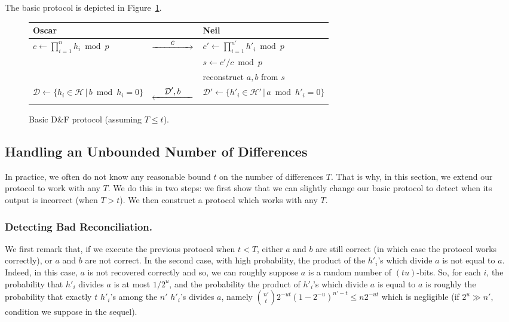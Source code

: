 \documentclass[twoside,envcountsame,runningheads]{llncs}
\newcommand{\Set}{\mathcal{H}}
\newcommand{\SetD}{\mathcal{D}}
\newcommand{\df}{D\&F\xspace}
\newcommand{\Rflow}[1]{\stackrel{\displaystyle #1}{\hbox to 5em{\rightarrowfill}}}
\newcommand{\Lflow}[1]{\stackrel{\displaystyle #1}{\hbox to 5em{\leftarrowfill}}}
\newcommand{\comm}[1]{\todo{#1}}
\begin{document}
The basic protocol is depicted in Figure~\ref{fig:basic-df}.

\begin{figure}[t]
\centering
\begin{tabular}{p{}cp{}}
\toprule
\textbf{Oscar}                    &                        & \textbf{Neil}\\
\midrule
$c \gets \prod_{i=1}^n h_i \bmod p$        & $\Rflow{c}$               & $c' \gets \prod_{i=1}^{n'} h'_i \bmod p$ \\
                                  &                        & $s \gets c'/c \bmod p$ \\
                                  &                        & reconstruct  $a,b$ from $s$\\
$\SetD \gets \{ h_i \in \Set \,|\, b \bmod h_i = 0 \}$  & $\Lflow{\SetD',b}$  & $\SetD' \gets \{ h'_i \in \Set' \,|\, a \bmod h'_i = 0 \}$ \\
\bottomrule
\end{tabular}\vspace{-0.25cm} %
\caption{Basic \df protocol (assuming $T \le t$).}
\label{fig:basic-df}
\end{figure}

\subsection{Handling an Unbounded Number of Differences}

In practice, we often do not know any reasonable bound $t$ on the number of differences $T$.
That is why, in this section, we extend our protocol to work with any $T$.
We do this in two steps: we first show that we can slightly change our basic protocol to detect when its output is incorrect (when $T > t$).
We then construct a protocol which works with any $T$.

\subsubsection{Detecting Bad Reconciliation.}
We first remark that, if we execute the previous protocol when $t < T$, either $a$ and $b$ are still correct (in which case the protocol works correctly), or $a$ and $b$ are not correct.
In the second case, with high probability, the product of the $h'_i$'s which divide $a$ is not equal to $a$.
Indeed, in this case, $a$ is not recovered correctly and so, we can roughly suppose $a$ is a random number of $(tu)$-bits. So, for each $i$, the probability that $h'_i$ divides $a$ is at most $1/2^u$, and the probability the product of $h'_i$'s which divide $a$ is equal to $a$ is roughly the probability that exactly $t$ $h'_i$'s among the $n'$ $h'_i$'s divides $a$, namely $\binom{n'}{t} 2^{-ut} (1-2^{-u})^{n'-t} \le n 2^{-ut}$ which is negligible (if $2^{u} \gg n'$, condition we suppose in the sequel).
\comm{TODODAVID: check this}
\end{document}
